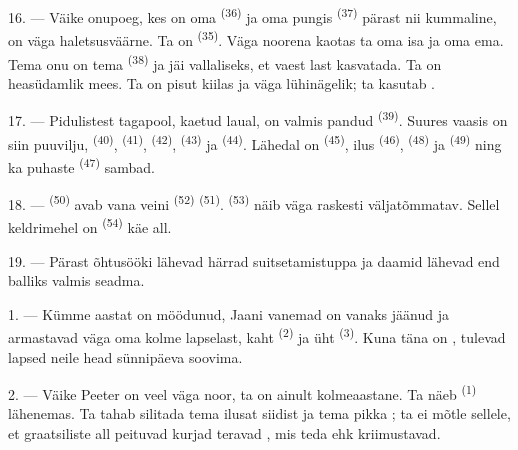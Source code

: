 16. --- Väike onupoeg, kes on oma  \textsuperscript{(36)} ja oma pungis
 \textsuperscript{(37)} pärast nii kummaline, on väga haletsusväärne.
Ta on  \textsuperscript{(35)}. Väga noorena kaotas ta oma isa ja oma ema.
Tema onu on tema  \textsuperscript{(38)} ja jäi vallaliseks, et
vaest last kasvatada. Ta on heasüdamlik mees. Ta on pisut kiilas ja väga lühinägelik;
ta kasutab .

\VUsaut{2.4mm}
\VUsaut{3.0mm}

17. --- Pidulistest tagapool,  kaetud laual, on valmis pandud
 \textsuperscript{(39)}. Suures vaasis on siin puuvilju,
 \textsuperscript{(40)},  \textsuperscript{(41)},
 \textsuperscript{(42)},  \textsuperscript{(43)} ja
 \textsuperscript{(44)}. Lähedal on 
\textsuperscript{(45)}, ilus  \textsuperscript{(46)},
 \textsuperscript{(48)} ja  \textsuperscript{(49)}
ning ka puhaste  \textsuperscript{(47)} sambad.

18. ---  \textsuperscript{(50)} avab vana veini 
\textsuperscript{(52)}  \textsuperscript{(51)}.
 \textsuperscript{(53)} näib väga raskesti väljatõmmatav. Sellel
keldrimehel on  \textsuperscript{(54)} käe all.

19. --- Pärast õhtusööki lähevad härrad suitsetamistuppa ja daamid lähevad end balliks
valmis seadma.

\VUsaut{5.0mm}
\VUsaut{1.6mm}
\VUsaut{2.6mm}

\VUsaut{3.0mm}

1. --- Kümme aastat on möödunud, Jaani vanemad on vanaks jäänud ja armastavad väga oma
kolme lapselast, kaht  \textsuperscript{(2)} ja üht
 \textsuperscript{(3)}. Kuna täna on ,
tulevad lapsed neile head sünnipäeva soovima.

2. --- Väike Peeter on veel väga noor, ta on ainult kolmeaastane. Ta näeb 
\textsuperscript{(1)} lähenemas. Ta tahab silitada tema ilusat siidist  ja
tema pikka ; ta ei mõtle sellele, et graatsiliste  all
peituvad kurjad teravad , mis teda ehk kriimustavad.

